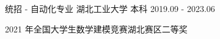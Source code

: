 

\begin{cventries}

  \cventry
    {统招 - 自动化专业} %
    {湖北工业大学} %
    {本科} %
    {2019.09 - 2023.06} %
    {
      \begin{cvitems} %
        \item {2021 年全国大学生数学建模竞赛湖北赛区二等奖}
      \end{cvitems}
    }
  
\end{cventries}
